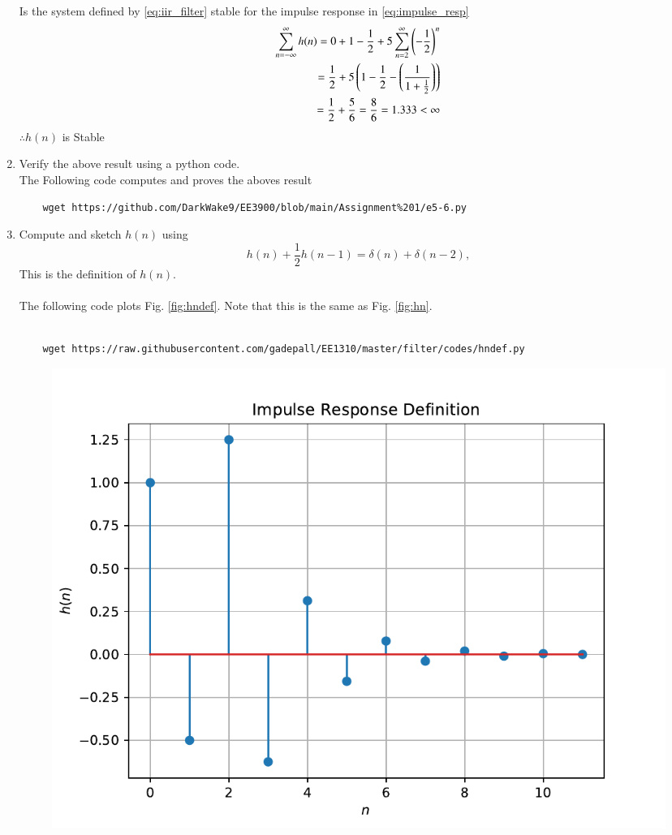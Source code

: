 \documentclass[journal,12pt,twocolumn]{IEEEtran}
\renewcommand\thesection{\arabic{section}}
\begin{document}
\begin{enumerate}[label=\thesection.\arabic*]
Is the system defined by \eqref{eq:iir_filter} stable for the impulse response in \eqref{eq:impulse_resp}\\
\solution
\begin{align}
	\sum_{n=-\infty}^{\infty}h(n) = 0 + 1 - \frac{1}{2} + 5\sum_{n=2}^{\infty} \left(-\dfrac{1}{2}\right)^{n}\\
	= \dfrac{1}{2} + 5\left(1 - \dfrac{1}{2} - \left(\dfrac{1}{1 + \tfrac{1}{2}}\right)\right)\\
	= \dfrac{1}{2} + \dfrac{5}{6} = \dfrac{8}{6} = 1.333 < \infty
\end{align}
$\therefore h(n)$  is Stable\\
\item Verify the above result using a python code.\\
\solution The Following code computes and proves the aboves result
\begin{lstlisting}
	wget https://github.com/DarkWake9/EE3900/blob/main/Assignment%201/e5-6.py
\end{lstlisting}
\item 
Compute and sketch $h(n)$ using 
\begin{equation}
	\label{eq:iir_filter_h}
	h(n) + \frac{1}{2}h(n-1) = \delta(n) + \delta(n-2), 
\end{equation}
%
This is the definition of $h(n)$.
\\\\
\solution The following code plots Fig. \ref{fig:hndef}. Note that this is the same as Fig. \ref{fig:hn}. \\\\
\begin{lstlisting}
	wget https://raw.githubusercontent.com/gadepall/EE1310/master/filter/codes/hndef.py
\end{lstlisting}
\begin{figure}[!ht]
	\centering
	\includegraphics[width=\columnwidth]{./figs/hndef}

\end{figure}
\end{enumerate}
\end{document}

